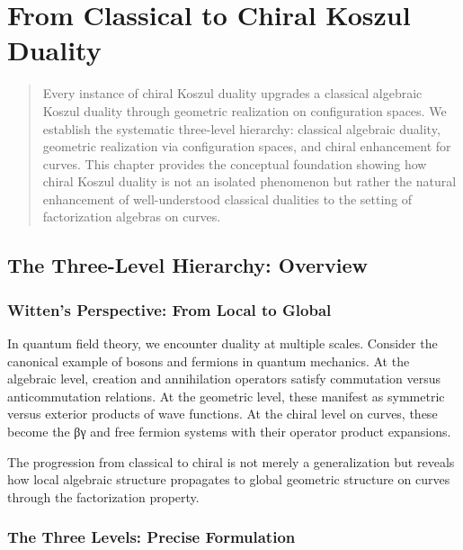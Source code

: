 
\chapter{From Classical to Chiral Koszul Duality}\label{chap:classical-to-chiral}

\begin{abstract}
Every instance of chiral Koszul duality upgrades a classical algebraic Koszul duality through geometric realization on configuration spaces. We establish the systematic three-level hierarchy: classical algebraic duality, geometric realization via configuration spaces, and chiral enhancement for curves. This chapter provides the conceptual foundation showing how chiral Koszul duality is not an isolated phenomenon but rather the natural enhancement of well-understood classical dualities to the setting of factorization algebras on curves.
\end{abstract}

\section{The Three-Level Hierarchy: Overview}

\subsection{Witten's Perspective: From Local to Global}

\begin{motivation}
In quantum field theory, we encounter duality at multiple scales. Consider the canonical example of bosons and fermions in quantum mechanics. At the algebraic level, creation and annihilation operators satisfy commutation versus anticommutation relations. At the geometric level, these manifest as symmetric versus exterior products of wave functions. At the chiral level on curves, these become the βγ and free fermion systems with their operator product expansions.

The progression from classical to chiral is not merely a generalization but reveals how local algebraic structure propagates to global geometric structure on curves through the factorization property.
\end{motivation}

\subsection{The Three Levels: Precise Formulation}


